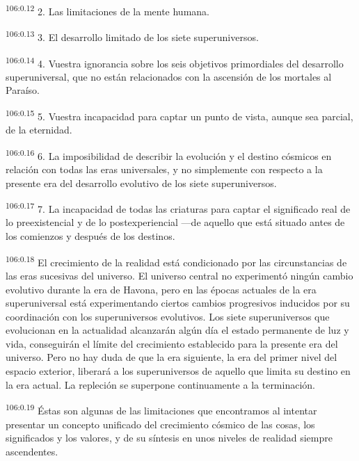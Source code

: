 \par
\textsuperscript{106:0.12} 2. Las limitaciones de la mente humana.

\par
\textsuperscript{106:0.13} 3. El desarrollo limitado de los siete superuniversos.

\par
\textsuperscript{106:0.14} 4. Vuestra ignorancia sobre los seis objetivos primordiales del desarrollo superuniversal, que no están relacionados con la ascensión de los mortales al Paraíso.

\par
\textsuperscript{106:0.15} 5. Vuestra incapacidad para captar un punto de vista, aunque sea parcial, de la eternidad.

\par
\textsuperscript{106:0.16} 6. La imposibilidad de describir la evolución y el destino cósmicos en relación con todas las eras universales, y no simplemente con respecto a la presente era del desarrollo evolutivo de los siete superuniversos.

\par
\textsuperscript{106:0.17} 7. La incapacidad de todas las criaturas para captar el significado real de lo preexistencial y de lo postexperiencial ---de aquello que está situado antes de los comienzos y después de los destinos.

\par
\textsuperscript{106:0.18} El crecimiento de la realidad está condicionado por las circunstancias de las eras sucesivas del universo. El universo central no experimentó ningún cambio evolutivo durante la era de Havona, pero en las épocas actuales de la era superuniversal está experimentando ciertos cambios progresivos inducidos por su coordinación con los superuniversos evolutivos. Los siete superuniversos que evolucionan en la actualidad alcanzarán algún día el estado permanente de luz y vida, conseguirán el límite del crecimiento establecido para la presente era del universo. Pero no hay duda de que la era siguiente, la era del primer nivel del espacio exterior, liberará a los superuniversos de aquello que limita su destino en la era actual. La repleción se superpone continuamente a la terminación.

\par
\textsuperscript{106:0.19} Éstas son algunas de las limitaciones que encontramos al intentar presentar un concepto unificado del crecimiento cósmico de las cosas, los significados y los valores, y de su síntesis en unos niveles de realidad siempre ascendentes.

